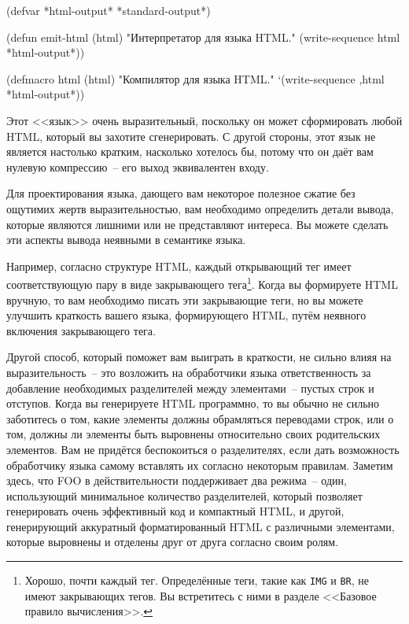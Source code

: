 \begin{myverb}
(defvar *html-output* *standard-output*)

(defun emit-html (html)
  "Интерпретатор для языка HTML."
  (write-sequence html *html-output*))

(defmacro html (html)
  "Компилятор для языка HTML."
  `(write-sequence ,html *html-output*))
\end{myverb}

Этот <<язык>> очень выразительный, поскольку он может сформировать любой HTML, который вы
захотите сгенерировать. С другой стороны, этот язык не является настолько кратким, насколько
хотелось бы, потому что он даёт вам нулевую компрессию~-- его выход эквивалентен входу.

Для проектирования языка, дающего вам некоторое полезное сжатие без ощутимих жертв
выразительностью, вам необходимо определить детали вывода, которые являются лишними или не
представляют интереса. Вы можете сделать эти аспекты вывода неявными в семантике языка.

Например, согласно структуре HTML, каждый открывающий тег имеет соответствующую пару в
виде закрывающего тега\footnote{Хорошо, почти каждый тег. Определённые теги, такие как
  \lstinline{IMG} и \lstinline{BR}, не имеют закрывающих тегов.  Вы встретитесь с ними в
  разделе <<Базовое правило вычисления>>.}\hspace{\footnotenegspace}. Когда вы формируете HTML вручную, то вам
необходимо писать эти закрывающие теги, но вы можете улучшить краткость вашего языка,
формирующего HTML, путём неявного включения закрывающего тега.

Другой способ, который поможет вам выиграть в краткости, не сильно влияя на
выразительность~-- это возложить на обработчики языка ответственность за добавление
необходимых разделителей между элементами~-- пустых строк и отступов. Когда вы генерируете
HTML программно, то вы обычно не сильно заботитесь о том, какие элементы должны
обрамляться переводами строк, или о том, должны ли элементы быть выровнены относительно
своих родительских элементов. Вам не придётся беспокоиться о разделителях, если дать
возможность обработчику языка самому вставлять их согласно некоторым правилам. Заметим
здесь, что FOO в действительности поддерживает два режима~-- один, использующий
минимальное количество разделителей, который позволяет генерировать очень эффективный код
и компактный HTML, и другой, генерирующий аккуратный форматированный HTML с различными
элементами, которые выровнены и отделены друг от друга согласно своим ролям.

